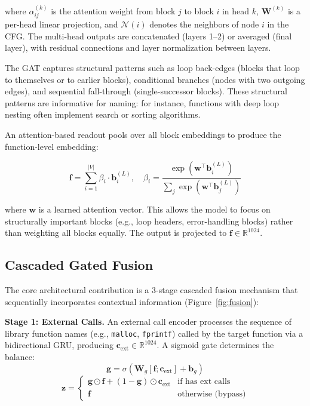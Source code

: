 \documentclass[sigconf,nonacm]{acmart}
\begin{document}
where $\alpha_{ij}^{(k)}$ is the attention weight from block $j$ to block $i$ in head $k$, $\mathbf{W}^{(k)}$ is a per-head linear projection, and $\mathcal{N}(i)$ denotes the neighbors of node $i$ in the CFG. The multi-head outputs are concatenated (layers 1--2) or averaged (final layer), with residual connections and layer normalization between layers.

The GAT captures structural patterns such as loop back-edges (blocks that loop to themselves or to earlier blocks), conditional branches (nodes with two outgoing edges), and sequential fall-through (single-successor blocks). These structural patterns are informative for naming: for instance, functions with deep loop nesting often implement search or sorting algorithms.

An attention-based readout pools over all block embeddings to produce the function-level embedding:

\begin{equation}
    \mathbf{f} = \sum_{i=1}^{|V|} \beta_i \cdot \mathbf{b}_i^{(L)}, \quad \beta_i = \frac{\exp(\mathbf{w}^\top \mathbf{b}_i^{(L)})}{\sum_{j} \exp(\mathbf{w}^\top \mathbf{b}_j^{(L)})}
\end{equation}

where $\mathbf{w}$ is a learned attention vector. This allows the model to focus on structurally important blocks (e.g., loop headers, error-handling blocks) rather than weighting all blocks equally. The output is projected to $\mathbf{f} \in \mathbb{R}^{1024}$.

\subsection{Cascaded Gated Fusion}
\label{sec:fusion}

The core architectural contribution is a 3-stage cascaded fusion mechanism that sequentially incorporates contextual information (Figure~\ref{fig:fusion}):

\textbf{Stage 1: External Calls.} An external call encoder processes the sequence of library function names (e.g., \texttt{malloc}, \texttt{fprintf}) called by the target function via a bidirectional GRU, producing $\mathbf{c}_\text{ext} \in \mathbb{R}^{1024}$. A sigmoid gate determines the balance:
\begin{equation}
    \mathbf{g} = \sigma(\mathbf{W}_g [\mathbf{f}; \mathbf{c}_\text{ext}] + \mathbf{b}_g)
\end{equation}
\begin{equation}
    \mathbf{z} = \begin{cases}
        \mathbf{g} \odot \mathbf{f} + (1 - \mathbf{g}) \odot \mathbf{c}_\text{ext} & \text{if has ext calls} \\
        \mathbf{f} & \text{otherwise (bypass)}
    \end{cases}
\end{equation}
\end{document}
